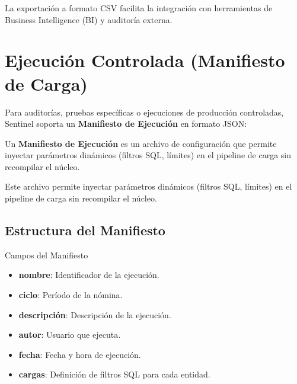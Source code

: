 
La exportación a formato CSV facilita la integración con herramientas de Business Intelligence (BI) y auditoría externa.


\section{Ejecución Controlada (Manifiesto de Carga)}

Para auditorías, pruebas específicas o ejecuciones de producción controladas, Sentinel soporta un \textbf{Manifiesto de Ejecución} en formato JSON:

\begin{definicion}
Un \textbf{Manifiesto de Ejecución} es un archivo de configuración que permite inyectar parámetros dinámicos (filtros SQL, límites) en el pipeline de carga sin recompilar el núcleo.
\end{definicion}


Este archivo permite inyectar parámetros dinámicos (filtros SQL, límites) en el pipeline de carga sin recompilar el núcleo.

\subsection{Estructura del Manifiesto}

\begin{caja}{Campos del Manifiesto}
\begin{itemize}
\item \textbf{nombre}: Identificador de la ejecución.
\item \textbf{ciclo}: Período de la nómina.
\item \textbf{descripción}: Descripción de la ejecución.
\item \textbf{autor}: Usuario que ejecuta.
\item \textbf{fecha}: Fecha y hora de ejecución.
\item \textbf{cargas}: Definición de filtros SQL para cada entidad.
\end{itemize}
\end{caja}

